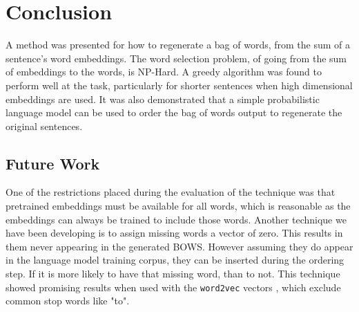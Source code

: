 \documentclass[11pt]{article}
\numberwithin{equation}{section}
\numberwithin{figure}{section}
\theoremstyle{plain}
\theoremstyle{definition}
\begin{document}


\section{Conclusion} \label{conclusion}
A method was presented for how to regenerate a bag of words, from the sum of a sentence's word embeddings. The word selection problem, of going from the sum of embeddings to the words, is NP-Hard. A greedy algorithm was found to perform well at the task, particularly for shorter sentences when high dimensional embeddings are used. It was also demonstrated that a simple probabilistic language model can be used to order the bag of words output to regenerate the original sentences.

\subsection{Future Work}\label{future}
One of the restrictions placed during the evaluation of the technique was that pretrained embeddings must be available for all words, which is reasonable as the embeddings can always be trained to include those words. Another technique we have been developing is to assign missing words a vector of zero. This results in them never appearing in the generated BOWS. However assuming they do appear in the language model training corpus, they can be inserted during the ordering step. If it is more likely to have that missing word, than to not. This technique showed promising results when used with the \texttt{word2vec} vectors \parencite{mikolovSkip}, which exclude common stop words like "to".
\printbibliography
	
\end{document}
